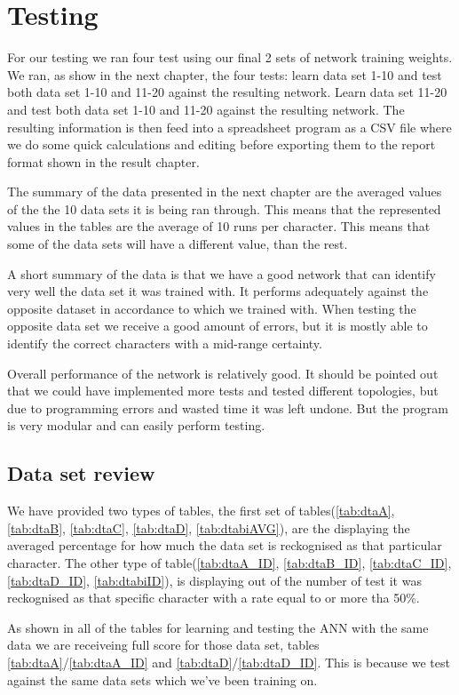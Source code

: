 \section{Testing}
For our testing we ran four test using our final 2 sets of network training
weights.  We ran, as show in the next chapter, the four tests: learn data set
1-10 and test both data set 1-10 and 11-20 against the resulting network. Learn
data set 11-20 and test both data set 1-10 and 11-20 against the resulting
network.  The resulting information is then feed into a spreadsheet program as a
CSV file where we do some quick calculations and editing before exporting them
to the report format shown in the result chapter.

The summary of the data presented in the next chapter are the averaged values of
the the 10 data sets it is being ran through.  This means that the represented
values in the tables are the average of 10 runs per character.  This means that
some of the data sets will have a different value, than the rest.

A short summary of the data is that we have a good network that can identify
very well the data set it was trained with. It performs adequately against the
opposite dataset in accordance to which we trained with. When testing the
opposite data set we receive a good amount of errors, but it is mostly able to
identify the correct characters with a mid-range certainty.

Overall performance of the network is relatively good. It should be pointed out
that we could have implemented more tests and tested different topologies, but
due to programming errors and wasted time it was left undone. But the program is
very modular and can easily perform testing.

\subsection{Data set review}
We have provided two types of tables, the first set of tables(\ref{tab:dtaA},
\ref{tab:dtaB}, \ref{tab:dtaC}, \ref{tab:dtaD}, \ref{tab:dtabiAVG}), are the
displaying the averaged percentage for how much the data set is reckognised as
that particular character.  The other type of table(\ref{tab:dtaA_ID},
\ref{tab:dtaB_ID}, \ref{tab:dtaC_ID}, \ref{tab:dtaD_ID}, \ref{tab:dtabiID}),
is displaying out of the number of test it was reckognised as that specific
character with a rate equal to or more tha 50\%.

As shown in all of the tables for learning and testing the ANN with the same
data we are receiveing full score for those data set, tables
\ref{tab:dtaA}/\ref{tab:dtaA_ID} and \ref{tab:dtaD}/\ref{tab:dtaD_ID}.  This is
because we test against the same data sets which we've been training on.

